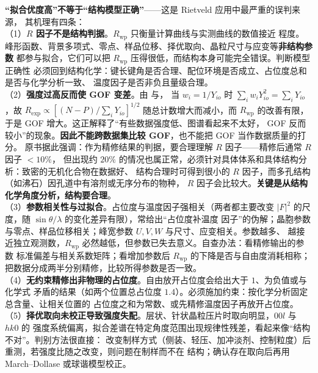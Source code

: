\begin{pitfall}
\textbf{``拟合优度高''不等于``结构模型正确''}——这是 Rietveld 应用中最严重的误判来源，
其机理有四条：\\
（1）\textbf{$R$ 因子不是结构判据}。$R_{\mathrm{wp}}$ 只衡量计算曲线与实测曲线的数值接近
程度。峰形函数、背景多项式、零点、样品位移、择优取向、晶粒尺寸与应变等\textbf{非结构参数}
都参与拟合，它们可以把 $R_{\mathrm{wp}}$ 压得很低，而结构本身可能完全错误。判断模型正确性
必须回到结构化学：键长键角是否合理、配位环境是否成立、占位度总和是否与化学分析一致、
温度因子是否非负且量级合理。\\
（2）\textbf{强度过高反而使 GOF 变差}。由 与，
当 $w_{i}=1/Y_{io}$ 时 $\sum_{i}w_{i}Y_{io}^{2}=\sum_{i}Y_{io}$，故
$R_{\mathrm{exp}}\propto\left[(N-P)/\sum_{i}Y_{io}\right]^{1/2}$ 随总计数增大而减小，而
$R_{\mathrm{wp}}$ 的改善有限，于是 GOF 增大。这正解释了``有些数据强度低、图谱看起来不太好，
GOF 反而较小''的现象。\textbf{因此不能跨数据集比较 GOF}，也不能把 GOF 当作数据质量的打分。
原书据此强调：作为精修结果的判据，要合理理解 $R$ 因子——精修后通常 $R$ 因子 $<10\%$，
但出现约 $20\%$ 的情况也属正常，必须针对具体体系和具体结构分析：致密的无机化合物在数据好、
结构合理时可得到很小的 $R$ 因子，而多孔结构（如沸石）因孔道中有溶剂或无序分布的物种，
$R$ 因子会比较大。\textbf{关键是从结构化学角度分析，结构要合理}。\\
（3）\textbf{参数相关性与过拟合}。占位度与温度因子强相关（两者都主要改变
$\left|F\right|^{2}$ 的尺度，随 $\sin\theta/\lambda$ 的变化差异有限），常给出``占位度补温度
因子''的伪解；晶胞参数与零点、样品位移相关；峰宽参数 $U,V,W$ 与尺寸、应变相关。参数越多、
越接近独立观测数，$R_{\mathrm{wp}}$ 必然越低，但参数已失去意义。自查办法：看精修输出的参数
标准偏差与相关系数矩阵；看增加参数后 $R_{\mathrm{wp}}$ 的下降是否与自由度消耗相称；
把数据分成两半分别精修，比较所得参数是否一致。\\
（4）\textbf{无约束精修出非物理的占位度}。自由放开占位度会给出大于 $1$、为负值或与化学式
矛盾的结果（如两个位置总占位度 $1.4$）。必须施加约束：按化学分析固定总含量、让相关位置的
占位度之和为常数、或先精修温度因子再放开占位度。\\
（5）\textbf{择优取向未校正导致强度失配}。层状、针状晶粒压片时取向明显，$00l$ 与 $hk0$ 的
强度系统偏离，拟合差谱在特定角度范围出现规律性残差，看起来像``结构不对''。判别方法很直接：
改变制样方式（侧装、轻压、加冲淡剂、控制粒度）后重测，若强度比随之改变，则问题在制样而不在
结构；确认存在取向后再用 March--Dollase 或球谐模型校正。
\end{pitfall}

